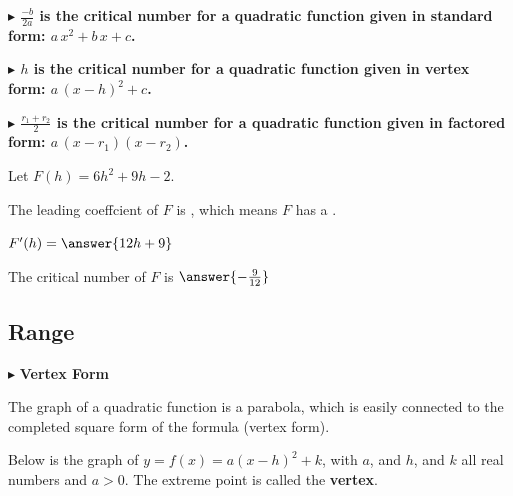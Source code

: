 \documentclass{ximera}
\begin{document}
\textbf{\textcolor{blue!55!black}{$\blacktriangleright$ $\frac{-b}{2a}$ is the critical number for a quadratic function given in standard form: $a \, x^2 + b \, x + c$.}}  



\textbf{\textcolor{blue!55!black}{$\blacktriangleright$ $h$ is the critical number for a quadratic function given in vertex form: $a \, (x - h)^2 + c$.}}  



\textbf{\textcolor{blue!55!black}{$\blacktriangleright$ $\frac{r_1 + r_2}{2}$ is the critical number for a quadratic function given in factored form: $a \, (x - r_1) (x - r_2)$.}}  












\begin{question} 


Let $F(h) = 6 h^2 + 9 h - 2$.



The leading coeffcient of $F$ is , which means $F$ has a .



$F'(h) = \answer{12h+9}$



The critical number of $F$ is $\answer{-\frac{9}{12}}$



\end{question}











\subsection*{Range}


$\blacktriangleright$  \textbf{Vertex Form} 


The graph of a quadratic function is a parabola, which is easily connected to the completed square form of the formula (vertex form).

Below is the graph of $y = f(x) = a (x - h)^2 + k$, with $a$, and $h$, and $k$ all real numbers and $a > 0$. The extreme point is called the \textbf{vertex}. 
\end{document}
